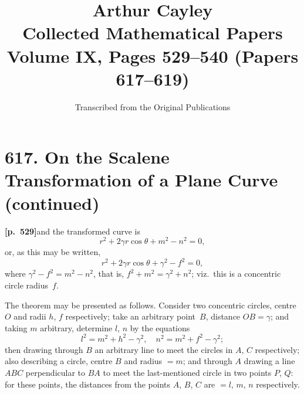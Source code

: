 \documentclass[11pt,a4paper]{article}
\title{\textbf{Arthur Cayley}\\\vspace{0.5em}
\Large Collected Mathematical Papers\\\vspace{0.3em}
\large Volume IX, Pages 529--540 (Papers 617--619)}
\author{Transcribed from the Original Publications}
\date{}
\begin{document}
\maketitle
\thispagestyle{empty}

\tableofcontents
\newpage

\section*{\textbf{617.} On the Scalene Transformation of a Plane Curve \textnormal{(continued)}}

\bigskip

\noindent\textbf{[p.~529]}\quad and the transformed curve is
\[
r^{2} + 2\gamma r \cos\theta + m^{2} - n^{2} = 0,
\]
or, as this may be written,
\[
r^{2} + 2\gamma r \cos\theta + \gamma^{2} - f^{2} = 0,
\]
where $\gamma^{2} - f^{2} = m^{2} - n^{2}$, that is, $f^{2} + m^{2} = \gamma^{2} + n^{2}$; viz.\ this is a concentric circle radius~$f$.

The theorem may be presented as follows. Consider two concentric circles, centre $O$ and radii $h$, $f$ respectively; take an arbitrary point~$B$, distance $OB = \gamma$; and taking $m$ arbitrary, determine $l$, $n$ by the equations
\[
l^{2} = m^{2} + h^{2} - \gamma^{2}, \quad n^{2} = m^{2} + f^{2} - \gamma^{2};
\]
then drawing through $B$ an arbitrary line to meet the circles in $A$, $C$ respectively; also describing a circle, centre $B$ and radius $= m$; and through $A$ drawing a line $ABC$ perpendicular to $BA$ to meet the last-mentioned circle in two points $P$, $Q$: for these points, the distances from the points $A$, $B$, $C$ are $= l$, $m$, $n$ respectively.
\end{document}
